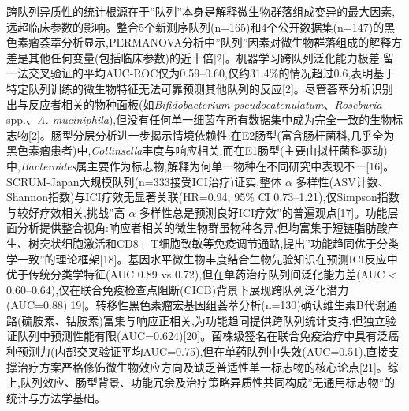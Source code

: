 跨队列异质性的统计根源在于''队列''本身是解释微生物群落组成变异的最大因素,远超临床参数的影响。整合5个新测序队列(n=165)和4个公开数据集(n=147)的黑色素瘤荟萃分析显示,PERMANOVA分析中''队列''因素对微生物群落组成的解释方差是其他任何变量(包括临床参数)的近十倍{[}2{]}。机器学习跨队列泛化能力极差:留一法交叉验证的平均AUC-ROC仅为0.59--0.60,仅约31.4\%的情况超过0.6,表明基于特定队列训练的微生物特征无法可靠预测其他队列的反应{[}2{]}。尽管荟萃分析识别出与反应者相关的物种面板(如\emph{Bifidobacterium pseudocatenulatum}、\emph{Roseburia} spp.、\emph{A. muciniphila}),但没有任何单一细菌在所有数据集中成为完全一致的生物标志物{[}2{]}。肠型分层分析进一步揭示情境依赖性:在E2肠型(富含肠杆菌科,几乎全为黑色素瘤患者)中,\emph{Collinsella}丰度与响应相关,而在E1肠型(主要由拟杆菌科驱动)中,\emph{Bacteroides}属主要作为标志物,解释为何单一物种在不同研究中表现不一{[}16{]}。SCRUM-Japan大规模队列(n=333接受ICI治疗)证实,整体 \(\alpha\) 多样性(ASV计数、Shannon指数)与ICI疗效无显著关联(HR=0.94, 95\% CI 0.73--1.21),仅Simpson指数与较好疗效相关,挑战''高 \(\alpha\) 多样性总是预测良好ICI疗效''的普遍观点{[}17{]}。功能层面分析提供整合视角:响应者相关的微生物群虽物种各异,但均富集于短链脂肪酸产生、树突状细胞激活和CD8+ T细胞致敏等免疫调节通路,提出''功能趋同优于分类学一致''的理论框架{[}18{]}。基因水平微生物丰度结合生物先验知识在预测ICI反应中优于传统分类学特征(AUC 0.89 vs 0.72),但在单药治疗队列间泛化能力差(AUC \textless{} 0.60--0.64),仅在联合免疫检查点阻断(CICB)背景下展现跨队列泛化潜力(AUC=0.88){[}19{]}。转移性黑色素瘤宏基因组荟萃分析(n=130)确认维生素B代谢通路(硫胺素、钴胺素)富集与响应正相关,为功能趋同提供跨队列统计支持,但独立验证队列中预测性能有限(AUC=0.624){[}20{]}。菌株级签名在联合免疫治疗中具有泛癌种预测力(内部交叉验证平均AUC=0.75),但在单药队列中失效(AUC=0.51),直接支撑治疗方案严格修饰微生物效应方向及缺乏普适性单一标志物的核心论点{[}21{]}。综上,队列效应、肠型背景、功能冗余及治疗策略异质性共同构成''无通用标志物''的统计与方法学基础。

